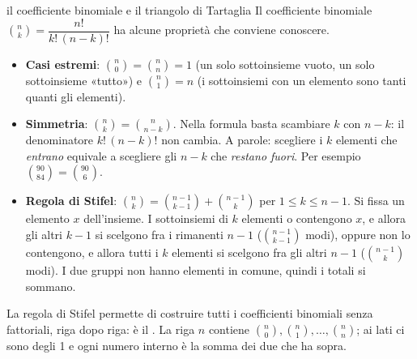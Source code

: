 \begin{richiamo}{il coefficiente binomiale e il triangolo di Tartaglia}
Il coefficiente binomiale $\binom{n}{k} = \dfrac{n!}{k!\,(n-k)!}$ ha alcune proprietà che conviene conoscere.
\begin{itemize}
  \item \textbf{Casi estremi}: $\binom{n}{0} = \binom{n}{n} = 1$ (un solo sottoinsieme vuoto, un solo sottoinsieme
        «tutto») e $\binom{n}{1} = n$ (i sottoinsiemi con un elemento sono tanti quanti gli elementi).
  \item \textbf{Simmetria}: $\binom{n}{k} = \binom{n}{n-k}$. Nella formula basta scambiare $k$ con $n - k$: il
        denominatore $k!\,(n-k)!$ non cambia. A parole: scegliere i $k$ elementi che \emph{entrano} equivale a
        scegliere gli $n - k$ che \emph{restano fuori}. Per esempio $\binom{90}{84} = \binom{90}{6}$.
  \item \textbf{Regola di Stifel}: $\binom{n}{k} = \binom{n-1}{k-1} + \binom{n-1}{k}$ per $1 \leq k \leq n - 1$.
        Si fissa un elemento $x$ dell'insieme. I sottoinsiemi di $k$ elementi o contengono $x$, e allora gli altri
        $k - 1$ si scelgono fra i rimanenti $n - 1$ ($\binom{n-1}{k-1}$ modi), oppure non lo contengono, e allora
        tutti i $k$ elementi si scelgono fra gli altri $n - 1$ ($\binom{n-1}{k}$ modi). I due gruppi non hanno
        elementi in comune, quindi i totali si sommano.
\end{itemize}
La regola di Stifel permette di costruire tutti i coefficienti binomiali senza fattoriali, riga dopo riga: è il
. La riga $n$ contiene $\binom{n}{0}, \binom{n}{1}, \ldots, \binom{n}{n}$; ai lati ci
sono degli 1 e ogni numero interno è la somma dei due che ha sopra.
\begin{center}
\end{center}
\end{richiamo}

